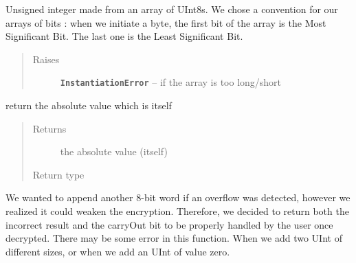 \documentclass[letterpaper,10pt,english]{sphinxmanual}
\begin{document}
\begin{fulllineitems}
\label{datatypes.integers:datatypes.integers.UInt.UInt}
Unsigned integer made from an array of UInt8s.
We chose a convention for our arrays of bits :
when we initiate a byte, the first bit of the array is the Most Significant Bit.
The last one is the Least Significant Bit.
\begin{quote}\begin{description}
\item[{Raises}] \leavevmode
\textbf{\texttt{InstantiationError}} -- if the array is too long/short

\end{description}\end{quote}

\begin{fulllineitems}
\label{datatypes.integers:datatypes.integers.UInt.UInt.__abs__}
return the absolute value which is itself
\begin{quote}\begin{description}
\item[{Returns}] \leavevmode
the absolute value (itself)

\item[{Return type}] \leavevmode
{\hyperref[datatypes.integers:module\string-datatypes.integers.UInt]{}}

\end{description}\end{quote}

\end{fulllineitems}


\begin{fulllineitems}
\label{datatypes.integers:datatypes.integers.UInt.UInt.__add__}
We wanted to append another 8-bit word if an overflow was detected, however we realized it could weaken the encryption.
Therefore, we decided to return both the incorrect result and the carryOut bit to be properly handled by the user once decrypted.
There may be some error in this function. When we add two UInt of different sizes, or when we add an UInt of value zero.


\end{fulllineitems}
\end{fulllineitems}
\end{document}
